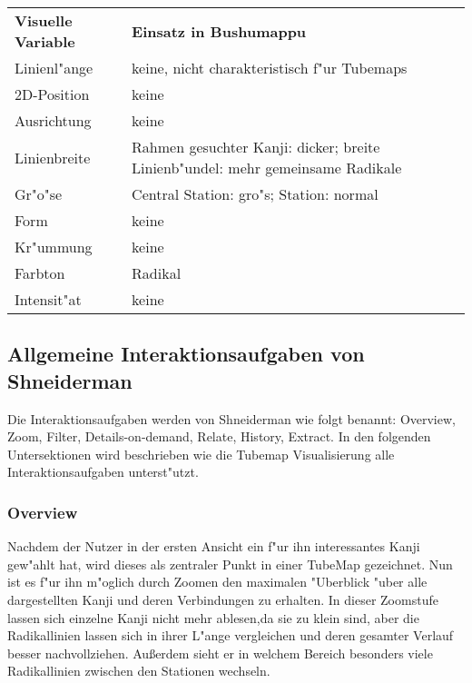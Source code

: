 \begin{table}[h]
\begin{tabular}{ll}

\textbf{Visuelle Variable} & \textbf{Einsatz in Bushumappu}                                                          \\
Linienl"ange       & keine, nicht charakteristisch f"ur Tubemaps                                    \\
2D-Position       & keine                                                                          \\
Ausrichtung       & keine                                                                          \\
Linienbreite      & Rahmen gesuchter Kanji: dicker; breite Linienb"undel: mehr gemeinsame Radikale \\
Gr"o"se             & Central Station: gro"s; Station: normal                                       \\
Form              & keine \\
Kr"ummung         & keine                                                                          \\
Farbton           & Radikal                                                                        \\
Intensit"at       & keine                                                                          \\
\end{tabular}
\end{table}

\subsection{Allgemeine Interaktionsaufgaben von Shneiderman}
Die Interaktionsaufgaben werden von Shneiderman wie folgt benannt: Overview, Zoom, Filter, Details-on-demand, Relate, History, Extract.  In den folgenden Untersektionen wird beschrieben wie die Tubemap Visualisierung alle Interaktionsaufgaben unterst"utzt. 

\subsubsection{Overview}
Nachdem der Nutzer in der ersten Ansicht ein f"ur ihn interessantes Kanji gew"ahlt hat, wird dieses als zentraler Punkt in einer TubeMap gezeichnet. Nun ist es f"ur ihn m"oglich durch Zoomen den maximalen "Uberblick "uber alle dargestellten Kanji und deren Verbindungen zu erhalten. In dieser Zoomstufe lassen sich einzelne Kanji nicht mehr ablesen,da sie zu klein sind, aber die Radikallinien lassen sich in ihrer L"ange vergleichen und deren gesamter Verlauf besser nachvollziehen. Außerdem sieht er in welchem Bereich besonders viele Radikallinien zwischen den Stationen wechseln.

